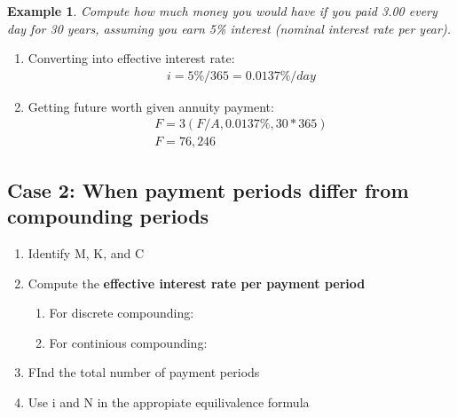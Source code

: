 \documentclass{report} %
\newtheorem{exmp}{Example}
\begin{document}
\begin{exmp}
    Compute how much money you would have if you paid 3.00 every day for 30 years, assuming you earn 5\% interest (nominal interest rate per year).
\end{exmp}
\begin{enumerate}
    \item Converting into effective interest rate:
    \begin{equation*}
        \begin{aligned}
            i = 5\%/365 = 0.0137\%/day
        \end{aligned}
    \end{equation*}
    \item Getting future worth given annuity payment:
    \begin{equation*}
        \begin{aligned}
            F = 3(F/A, 0.0137\%, 30*365) \\
            F = 76,246
        \end{aligned}
    \end{equation*}
\end{enumerate}

\subsection*{Case 2: When payment periods differ from compounding periods}
\begin{enumerate}
    \item Identify M, K, and C
    \item Compute the \textbf{effective interest rate per payment period}
    \begin{enumerate}
        \item For discrete compounding:
        \item For continious compounding:
    \end{enumerate}
    \item FInd the total number of payment periods
    \item Use i and N in the appropiate equilivalence formula
\end{enumerate}
\end{document}
